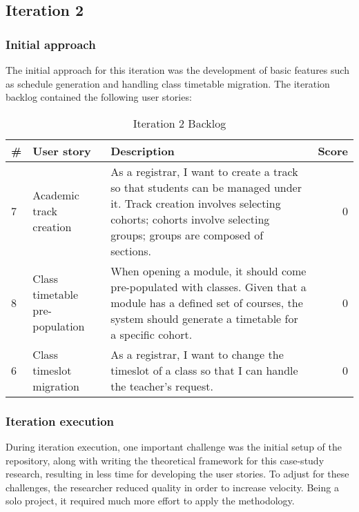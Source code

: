 \subsection{Iteration 2}

\subsubsection{Initial approach}
The initial approach for this iteration was the development of basic features such as schedule generation and handling class timetable migration.  
The iteration backlog contained the following user stories:

\begin{table}[ht]
\caption{Iteration 2 Backlog}
\label{tab:iteration-2-backlog}

\begin{tabularx}{\textwidth}{@{}llXr@{}}
\toprule
\textbf{\#} &
\textbf{User story} &
\textbf{Description} &
\textbf{Score} \\
\midrule
    7 &
    Academic track creation &
    As a registrar, I want to create a track so that students can be managed under it.
    Track creation involves selecting cohorts; cohorts involve selecting groups; groups are composed of sections. &
    0 \\

    8 &
    Class timetable pre-population &
    When opening a module, it should come pre-populated with classes.
    Given that a module has a defined set of courses, the system should generate a timetable for a specific cohort. &
    0 \\

    6 &
    Class timeslot migration &
    As a registrar, I want to change the timeslot of a class so that I can handle the teacher’s request. &
    0 \\
\bottomrule
\end{tabularx}
\end{table}

\subsubsection{Iteration execution}
During iteration execution, one important challenge was the initial setup of the repository, along with writing the theoretical framework for this case-study research, resulting in less time for developing the user stories.
To adjust for these challenges, the researcher reduced quality in order to increase velocity.
Being a solo project, it required much more effort to apply the methodology.

